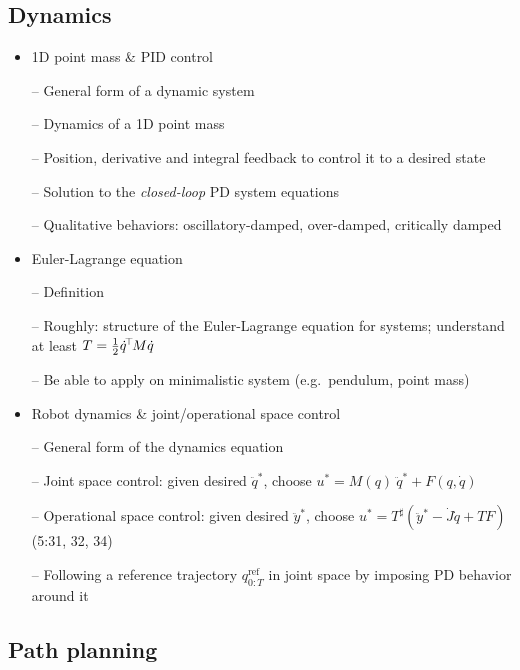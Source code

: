 \subsection{Dynamics}

\begin{itemize}
\item 1D point mass \& PID control

-- General form of a dynamic system

-- Dynamics of a 1D point mass

-- Position, derivative and integral feedback to control it to a
desired state

-- Solution to the \emph{closed-loop} PD system equations

-- Qualitative behaviors: oscillatory-damped, over-damped, critically
damped

\item Euler-Lagrange equation

-- Definition

-- Roughly: structure of the Euler-Lagrange equation for systems;
understand at least $T=\frac{1}{2} \dot q^{\!\top\!} M \dot q$

-- Be able to apply on minimalistic system (e.g.\ pendulum, point mass)

\item Robot dynamics \& joint/operational space control

-- General form of the dynamics equation

-- Joint space control: given desired $\ddot q^*$, choose $u^* = M(q)~
\ddot q^* + F(q,\dot q)$

-- Operational space control: given desired $\ddot y^*$, choose $u^* =
T^\sharp (\ddot y^* - \dot J \dot q + T F)$ (5:31, 32, 34)

-- Following a reference trajectory $q_{0:T}^\text{ref}$ in joint
space by imposing PD behavior around it

 
\end{itemize}

\subsection{Path planning}

